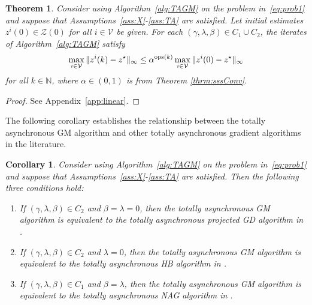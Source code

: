 \documentclass[9pt,shortpaper,twoside,web]{ieeecolor}
\newcommand{\X}{\ensuremath{\mathcal{X}}\xspace}
\newcommand{\Z}{\ensuremath{\mathcal{Z}}\xspace}
\newcommand{\V}{\ensuremath{\mathcal{V}}\xspace}
\newcommand{\ops}[1]{\textnormal{ops}(#1)}
\newcommand{\blue}[1]{{\textcolor{blue}{#1}}}
\newtheorem{theorem}{Theorem}
\newtheorem{corollary}{Corollary}
\begin{document}
\begin{theorem}\label{thrm:TAGM}
    Consider using Algorithm~\ref{alg:TAGM} on the problem in~\eqref{eq:prob1} and 
    suppose that Assumptions~\ref{ass:X}-\ref{ass:TA} are satisfied.
    Let initial estimates $z^i(0)\in\Z(0)$ for all $i\in\V$ be given.
    For each $(\gamma,\lambda,\beta)\in C_1\cup C_2$, %
    the iterates of Algorithm~\ref{alg:TAGM} satisfy
    \begin{equation}
        \max_{i\in\V}\Vert z^i(k)-z^\star\Vert_\infty \leq \alpha^{\ops{k}}\max_{i\in\V}\Vert z^i(0)-z^\star\Vert_\infty
    \end{equation}
    for all $k\in\mathbb N$, where $\alpha\in(0,1)$ is from Theorem \ref{thrm:sssConv}.
\end{theorem}
\begin{proof}
    See Appendix~\ref{app:linear}. 
\end{proof}

The following corollary establishes the relationship between the totally asynchronous GM algorithm and other totally asynchronous gradient algorithms in the literature.

\begin{corollary}\label{corr:comparison}
    Consider using Algorithm~\ref{alg:TAGM} on the problem in~\eqref{eq:prob1} and 
    suppose that Assumptions~\ref{ass:X}-\ref{ass:TA} are satisfied.
    Then the following three conditions hold:
    \begin{enumerate}
        \item If $(\gamma,\lambda,\beta)\in C_2$ and $\beta=\lambda=0$, then the totally asynchronous GM algorithm is equivalent to the totally asynchronous projected GD algorithm in \cite{bertsekas1989parallel}.
        \item If $(\gamma,\lambda,\beta)\in C_2$ and $\lambda = 0$, then the totally asynchronous GM algorithm is equivalent to the totally asynchronous HB algorithm in \cite{hustig2023totally}.
        \item If $(\gamma,\lambda,\beta)\in C_1$ and $\beta=\lambda$, then the totally asynchronous GM algorithm is equivalent to the totally asynchronous NAG algorithm in \cite{pond2024}.
    \end{enumerate}
\end{corollary}
\end{document}
